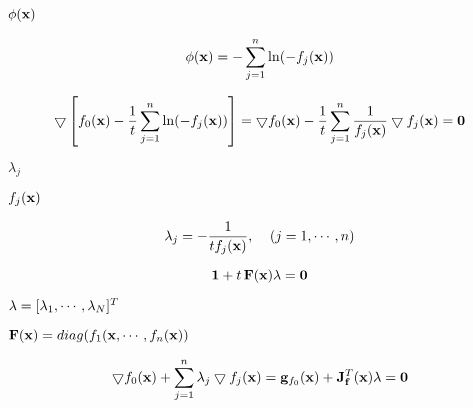 {\newpage\clearpage
{}%
$\phi({\bf x})$%
\lthtmlinlinemathZ
\lthtmlcheckvsize\clearpage}

{\newpage\clearpage
{}%
\begin{displaymath}
\phi({\bf x})=-\sum_{j=1}^n \ln(-f_j({\bf x}))
\end{displaymath}%
\lthtmldisplayZ
\lthtmlcheckvsize\clearpage}

{\newpage\clearpage
{}%
\begin{displaymath}
\bigtriangledown \left[ f_0({\bf x})-\frac{1}{t}\sum_{j=1}^n \ln(-f_j({\bf x})) \right]
=\bigtriangledown f_0({\bf x})-\frac{1}{t}\sum_{j=1}^n \frac{1}{f_j({\bf x})}
\bigtriangledown f_j({\bf x})={\bf0}
\end{displaymath}%
\lthtmldisplayZ
\lthtmlcheckvsize\clearpage}

{\newpage\clearpage
{}%
$\lambda_j$%
\lthtmlinlinemathZ
\lthtmlcheckvsize\clearpage}

{\newpage\clearpage
{}%
$f_j({\bf x})$%
\lthtmlinlinemathZ
\lthtmlcheckvsize\clearpage}

{\newpage\clearpage
{}%
\begin{displaymath}
\lambda_j=-\frac{1}{t f_j({\bf x})},\;\;\;\;(j=1,\cdots,n)
\end{displaymath}%
\lthtmldisplayZ
\lthtmlcheckvsize\clearpage}

{\newpage\clearpage
{}%
\begin{displaymath}
{\bf 1}+t\,{\bf F}({\bf x}){\bf\lambda}={\bf0}
\end{displaymath}%
\lthtmldisplayZ
\lthtmlcheckvsize\clearpage}

{\newpage\clearpage
{}%
${\bf\lambda}=[\lambda_1,\cdots,\lambda_N]^T$%
\lthtmlinlinemathZ
\lthtmlcheckvsize\clearpage}

{\newpage\clearpage
{}%
${\bf F}({\bf x})=diag(f_1({\bf x},\cdots,f_n({\bf x}))$%
\lthtmlinlinemathZ
\lthtmlcheckvsize\clearpage}

{\newpage\clearpage
{}%
\begin{displaymath}
\bigtriangledown f_0({\bf x})+\sum_{j=1}^n \lambda_j\bigtriangledown f_j({\bf x})
={\bf g}_{f_0}({\bf x})+{\bf J}_{\bf f}^T({\bf x}){\bf\lambda}={\bf0}
\end{displaymath}%
\lthtmldisplayZ
\lthtmlcheckvsize\clearpage}

